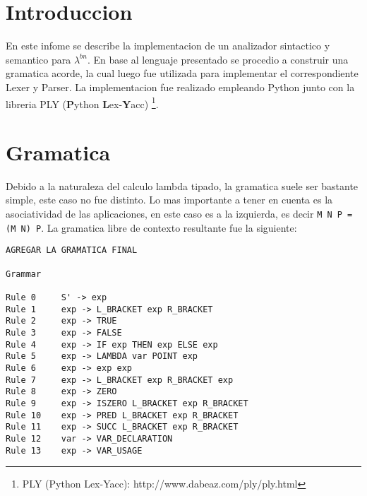 \documentclass{article}
\theoremstyle{definition}
\theoremstyle{remark}
\begin{document}
{} %

 
 
\maketitle

\tableofcontents

\pagebreak

\section{Introduccion}

En este infome se describe la implementacion de un analizador sintactico y semantico para $\lambda^{bn}$. En base al lenguaje presentado se procedio a construir una gramatica acorde, la cual luego fue utilizada para implementar el correspondiente Lexer y Parser. La implementacion fue realizado empleando Python junto con la libreria PLY (\textbf{P}ython \textbf{L}ex-\textbf{Y}acc) \footnote{PLY (Python Lex-Yacc): http://www.dabeaz.com/ply/ply.html}.

\section{Gramatica}

Debido a la naturaleza del calculo lambda tipado, la gramatica suele ser bastante simple, este caso no fue distinto. Lo mas importante a tener en cuenta es la asociatividad de las aplicaciones, en este caso es a la izquierda, es decir \texttt{M N P = (M N) P}. La gramatica libre de contexto resultante fue la siguiente:

\begin{verbatim}
AGREGAR LA GRAMATICA FINAL

Grammar

Rule 0     S' -> exp
Rule 1     exp -> L_BRACKET exp R_BRACKET
Rule 2     exp -> TRUE
Rule 3     exp -> FALSE
Rule 4     exp -> IF exp THEN exp ELSE exp
Rule 5     exp -> LAMBDA var POINT exp
Rule 6     exp -> exp exp
Rule 7     exp -> L_BRACKET exp R_BRACKET exp
Rule 8     exp -> ZERO
Rule 9     exp -> ISZERO L_BRACKET exp R_BRACKET
Rule 10    exp -> PRED L_BRACKET exp R_BRACKET
Rule 11    exp -> SUCC L_BRACKET exp R_BRACKET
Rule 12    var -> VAR_DECLARATION
Rule 13    exp -> VAR_USAGE
\end{verbatim}
\end{document}
